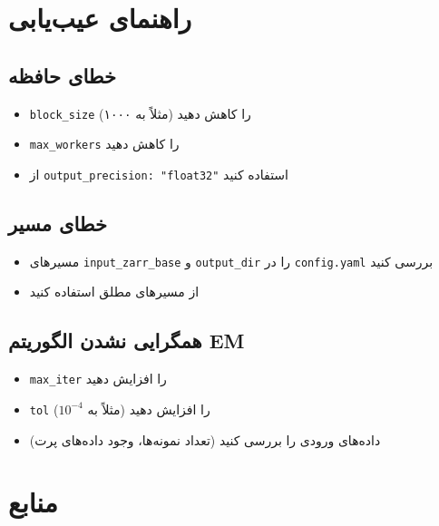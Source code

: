\documentclass[a4paper,12pt]{article}
\begin{document}
\section{راهنمای عیب‌یابی}

\subsection{خطای حافظه}

\begin{itemize}
\item \texttt{block\_size} را کاهش دهید (مثلاً به ۱۰۰۰)
\item \texttt{max\_workers} را کاهش دهید
\item از \texttt{output\_precision: "float32"} استفاده کنید
\end{itemize}

\subsection{خطای مسیر}

\begin{itemize}
\item مسیرهای \texttt{input\_zarr\_base} و \texttt{output\_dir} را در \texttt{config.yaml} بررسی کنید
\item از مسیرهای مطلق استفاده کنید
\end{itemize}

\subsection{همگرایی نشدن الگوریتم EM}

\begin{itemize}
\item \texttt{max\_iter} را افزایش دهید
\item \texttt{tol} را افزایش دهید (مثلاً به $10^{-4}$)
\item داده‌های ورودی را بررسی کنید (تعداد نمونه‌ها، وجود داده‌های پرت)
\end{itemize}

\section*{منابع}
\end{document}
